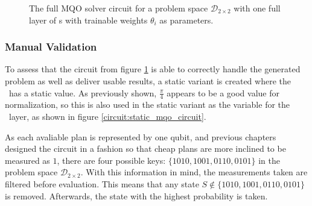 \begin{figure}[!h]
    \centering
    \caption{The full MQO solver circuit for a problem space $\mathcal{D}_{2\times2}$ with one full layer of \rxgate s with trainable weights $\theta_i$ as parameters.}
    \label{circuit:full_trainable_mqp_circuit}
\end{figure}

\subsubsection{Manual Validation}
\label{chapter:mqo_manual_validation}
To assess that the circuit from figure \ref{circuit:full_trainable_mqp_circuit} is able to correctly handle the generated problem as well as deliver usable results, a static variant is created where the \rxgate\ has a static value. As previously shown, $\frac{\pi}{4}$ appears to be a good value for normalization, so this is also used in the static variant as the variable for the \rxgate\ layer, as shown in figure \ref{circuit:static_mqo_circuit}.\par
As each avaliable plan is represented by one qubit, and previous chapters designed the circuit in a fashion so that cheap plans are more inclined to be measured as $1$, there are four possible keys: $\{1010, 1001, 0110, 0101\}$ in the problem space $\mathcal{D}_{2\times2}$. With this information in mind, the measurements taken are filtered before evaluation. This means that any state $S \notin \{1010, 1001, 0110, 0101\}$ is removed. Afterwards, the state with the highest probability is taken.

